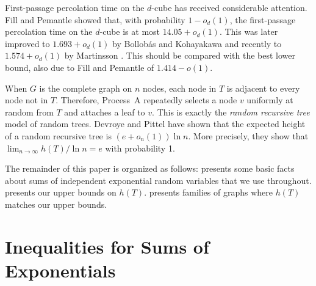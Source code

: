 \documentclass[lotsofwhite]{patmorin}
\begin{document}
First-passage percolation time on the $d$-cube has received considerable
attention. Fill and Pemantle \cite{fill.pemantle:percolation} showed
that, with probability $1-o_d(1)$, the first-passage percolation time on
the $d$-cube is at most $14.05+o_d(1)$.  This was later improved to $1.693
+o_d(1)$ by Bollob\'as and Kohayakawa \cite{bollobas.kohayakawa:on} and
recently to  $1.574 +o_d(1)$ by Martinsson \cite{martinsson:unoriented}.
This should be compared with the best lower bound, also due to Fill and
Pemantle \cite{fill.pemantle:percolation} of $1.414-o(1)$.

When $G$ is the complete graph on $n$ nodes, each node in $T$ is adjacent
to every node not in $T$.  Therefore, Process~A repeatedly selects
a node $v$ uniformly at random from $T$ and attaches a leaf to $v$.
This is exactly the \emph{random recursive tree} model of random trees.
Devroye \cite{devroye:branching} and Pittel \cite{pittel:note} have shown
that the expected height of a random recursive tree is $(e+o_n(1))\ln n$.
More precisely, they show that $\lim_{n\to\infty} h(T)/\ln n = e$ with
probability 1. 

The remainder of this paper is organized as follows:
 presents some basic facts about sums of
independent exponential random variables that we use throughout.
 presents our upper bounds on $h(T)$.
 presents families of graphs where $h(T)$ matches our upper
bounds.

\section{Inequalities for Sums of Exponentials}
\end{document}
